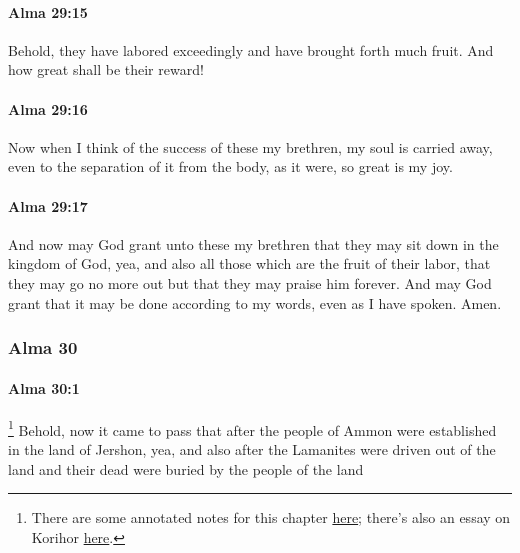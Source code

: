 		\paragraph{Alma 29:15} %
			\label{ALMA-29-15}

			Behold, they have labored exceedingly and have brought forth much fruit.
			And how great shall be their reward!

		\paragraph{Alma 29:16} %
			\label{ALMA-29-16}

			Now when I think of the success of these my brethren,
			my soul is carried away,
			even to the separation of it from the body, as it were,
			so great is my joy.

		\paragraph{Alma 29:17} %
			\label{ALMA-29-17}

			And now may God grant unto these my brethren
			that they may sit down in the kingdom of God,
			yea, and also all those which are the fruit of their labor,
			that they may go no more out
			but that they may praise him forever.
			And may God grant that it may be done according to my words,
			even as I have spoken.
			Amen.

	\subsubsection{Alma 30} %
		\label{ALMA-30}
		
		\paragraph{Alma 30:1} %
			\label{ALMA-30-1}
	
				\footnote{%
					There are some annotated notes for this chapter \href{https://drive.google.com/file/d/1PKCPq4S4f6sir70ght8XjiqQvm3Q0Zx1/view?usp=sharing}{here}; there's also an essay on Korihor \href{https://climbingtherainbows.substack.com/p/why-does-korihor-have-to-be-such-koribore}{here}.
					}%
			Behold, now it came to pass that
			after the people of Ammon were established in the land of Jershon,
			yea, and also after the Lamanites were driven out of the land
			and their dead were buried by the people of the land

